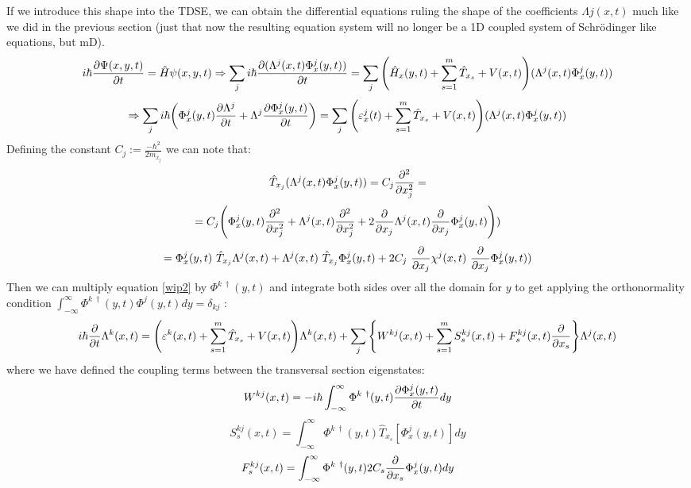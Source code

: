 \documentclass[11pt, a4paper]{article} %
\begin{document}
If we introduce this shape into the TDSE, we can obtain the differential equations ruling the shape of the coefficients $\Lambda j(x,t)$ much like we did in the previous section (just that now the resulting equation system will no longer be a 1D coupled system of Schrödinger like equations, but mD).
\begin{equation}\label{wip2}
i\hbar \pdv{\Psi(x,y,t)}{t}=\hat{H}\psi(x,y,t)\Rightarrow \sum_j i\hbar \pdv{(\Lambda^j(x,t)\Phi^j_x(y,t))}{t}=\sum_j\qty(\hat{H}_x(y,t)+\sum_{s=1}^m\hat{T}_{x_s}+V(x,t))(\Lambda^j(x,t)\Phi^j_x(y,t))
\end{equation}
$$
\Rightarrow \sum_j i\hbar\qty( \Phi^j_x(y,t)\pdv{\Lambda^j}{t} + \Lambda^j\pdv{\Phi^j_x(y,t)}{t}) = \sum_j\qty(\varepsilon^j_x(t)+\sum_{s=1}^m\hat{T}_{x_s}+V(x,t))(\Lambda^j(x,t)\Phi^j_x(y,t))
$$
Defining the constant $C_j:=\frac{-\hbar^2}{2m_{x_j}}$ we can note that:
\begin{equation}
\hat{T}_{x_j} (\Lambda^j(x,t)\Phi^j_x(y,t)) = C_j\pdv[2]{}{x_j}(\Lambda^j(x,t)\Phi^j_x(y,t))=
\end{equation}
$$
=C_j\qty(\Phi^j_x(y,t)\pdv[2]{}{x_j}(\Lambda^j(x,t))+\Lambda^j(x,t)\pdv[2]{}{x_j}(\Phi^j_x(y,t)) +2 \pdv{}{x_j}\Lambda^j(x,t) \pdv{}{x_j}\Phi^j_x(y,t)))
$$
$$
=\Phi^j_x(y,t)\ \hat{T}_{x_j} \Lambda^j(x,t) + \Lambda^j(x,t)\  \hat{T}_{x_j}  \Phi^j_x(y,t) +2C_j\ \pdv{}{x_j}\chi^j(x,t)\ \pdv{}{x_j}\Phi^j_x(y,t))
$$
Then we can multiply equation \eqref{wip2} by $\Phi^{k\ \dagger}(y,t)$ and integrate both sides over all the domain for $y$ to get applying the orthonormality condition $\int_{-\infty}^{\infty}\Phi^{k\ \dagger}(y,t) \Phi^{j}(y,t) dy= \delta_{kj}$ :
\begin{equation}\label{XabEq}
i\hbar \pdv{}{t}\Lambda^k(x,t) = \qty( \varepsilon^k(x,t) + \sum_{s=1}^m\hat{T}_{x_s}+V(x,t))\Lambda^k(x,t)+ \sum_j \qty{ W^{kj}(x,t) + \sum_{s=1}^m S^{kj}_s(x,t)+F^{kj}_s(x,t)\pdv{}{x_s} } \Lambda^j(x,t) 
\end{equation}
where we have defined the coupling terms between the transversal section eigenstates:
\begin{equation}
W^{kj}(x,t) = -i\hbar\int_{-\infty}^{\infty}\Phi^{k\ \dagger}(y,t) \pdv{\Phi^j_x(y,t)}{t} dy
\end{equation}
\begin{equation}
S^{kj}_s(x,t) = \int_{-\infty}^{\infty}\Phi^{k\ \dagger}(y,t) \hat{T}_{x_s} [\Phi^j_x(y,t)] dy
\end{equation}
\begin{equation}
F^{kj}_s(x,t) = \int_{-\infty}^{\infty}\Phi^{k\ \dagger}(y,t) 2C_s \pdv{}{x_s}\Phi^j_x(y,t) dy
\end{equation}
\end{document}
